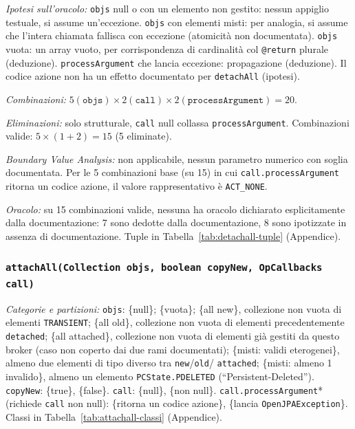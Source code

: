 \textit{Ipotesi sull'oracolo:} \texttt{objs} null o con un elemento non gestito: nessun appiglio
testuale, si assume un'eccezione. \texttt{objs} con elementi misti: per analogia, si assume che
l'intera chiamata fallisca con eccezione (atomicità non documentata). \texttt{objs} vuota: un
array vuoto, per corrispondenza di cardinalità col \texttt{@return} plurale (deduzione).
\texttt{processArgument} che lancia eccezione: propagazione (deduzione). Il codice azione non ha
un effetto documentato per \texttt{detachAll} (ipotesi).

\textit{Combinazioni:} $5 (\texttt{objs}) \times 2 (\texttt{call}) \times 2
(\texttt{processArgument}) = 20$.

\textit{Eliminazioni:} solo strutturale, \texttt{call} null collassa \texttt{processArgument}.
Combinazioni valide: $5 \times (1+2) = 15$ (5 eliminate).

\textit{Boundary Value Analysis:} non applicabile, nessun parametro numerico con soglia
documentata. Per le 5 combinazioni base (su 15) in cui \texttt{call.processArgument} ritorna un
codice azione, il valore rappresentativo è \texttt{ACT\_NONE}.

\textit{Oracolo:} su 15 combinazioni valide, nessuna ha oracolo dichiarato esplicitamente dalla
documentazione: 7 sono dedotte dalla documentazione, 8 sono ipotizzate in assenza di
documentazione. Tuple in Tabella~\ref{tab:detachall-tuple} (Appendice).

\subsubsection{\texttt{attachAll(Collection objs, boolean copyNew, OpCallbacks call)}}

\textit{Categorie e partizioni:} \texttt{objs}: \{null\}; \{vuota\}; \{all new\}, collezione non
vuota di elementi \texttt{TRANSIENT}; \{all old\}, collezione non vuota di elementi
precedentemente \texttt{detached}; \{all attached\}, collezione non vuota di elementi già
gestiti da questo broker (caso non coperto dai due rami documentati); \{misti: validi
eterogenei\}, almeno due elementi di tipo diverso tra \texttt{new}/\texttt{old}/
\texttt{attached}; \{misti: almeno 1 invalido\}, almeno un elemento \texttt{PCState.PDELETED}
(``Persistent-Deleted'').
\texttt{copyNew}: \{true\}, \{false\}. \texttt{call}: \{null\}, \{non null\}.
\texttt{call.processArgument}* (richiede \texttt{call} non null): \{ritorna un codice azione\},
\{lancia \texttt{OpenJPAException}\}. Classi in Tabella~\ref{tab:attachall-classi} (Appendice).

